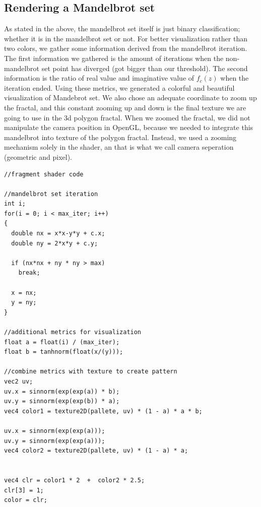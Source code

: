 \documentclass[a4paper]{article}
\begin{document}
\subsection{Rendering a Mandelbrot set}
As stated in the above, the mandelbrot set itself is just binary classification; whether it is in the mandelbrot set or not.
For better visualization rather than two colors, we gather some information derived from the mandelbrot iteration.
The first information we gathered is the amount of iterations when the non-mandelbrot set point has diverged (got bigger than our threshold).
The second information is the ratio of real value and imaginative value of $f_c(z)$ when the iteration ended.
Using these metrics, we generated a colorful and beautiful visualization of Mandebrot set.
We also chose an adequate coordinate to zoom up the fractal, and this constant zooming up and down is the final texture we are going to use in the 3d polygon fractal.
When we zoomed the fractal, we did not manipulate the camera position in OpenGL, because we needed to integrate this mandelbrot into texture of the polygon fractal.
Instead, we used a zooming mechanism solely in the shader, an that is what we call camera seperation (geometric and pixel).
\begin{lstlisting}[style=CStyle]
//fragment shader code

//mandelbrot set iteration
int i;
for(i = 0; i < max_iter; i++)
{
  double nx = x*x-y*y + c.x;
  double ny = 2*x*y + c.y;

  if (nx*nx + ny * ny > max)
    break;

  x = nx;
  y = ny;
}

//additional metrics for visualization
float a = float(i) / (max_iter);
float b = tanhnorm(float(x/(y)));

//combine metrics with texture to create pattern
vec2 uv;
uv.x = sinnorm(exp(exp(a)) * b);
uv.y = sinnorm(exp(exp(b)) * a);
vec4 color1 = texture2D(pallete, uv) * (1 - a) * a * b;

uv.x = sinnorm(exp(exp(a)));
uv.y = sinnorm(exp(exp(a)));
vec4 color2 = texture2D(pallete, uv) * (1 - a) * a;


vec4 clr = color1 * 2  +  color2 * 2.5;
clr[3] = 1;
color = clr;
\end{lstlisting}
\end{document}
